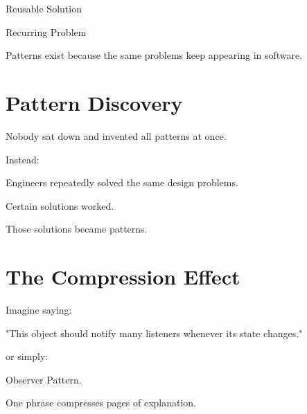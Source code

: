 \documentclass[11pt,a4paper]{book}
\begin{document}
Reusable Solution


Recurring Problem


Patterns exist because
the same problems keep
appearing in software.


\section{Pattern Discovery}

Nobody sat down and invented
all patterns at once.


Instead:


Engineers repeatedly solved
the same design problems.


Certain solutions worked.


Those solutions became patterns.


\section{The Compression Effect}

Imagine saying:


"This object should notify
many listeners whenever
its state changes."


or simply:


Observer Pattern.


One phrase compresses
pages of explanation.
\end{document}
